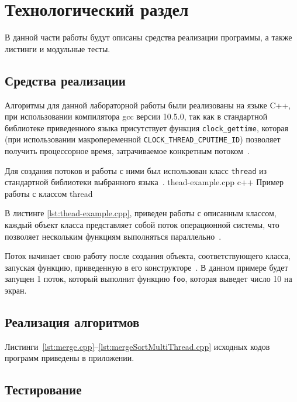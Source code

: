 \chapter{Технологический раздел}

В данной части работы будут описаны средства реализации программы, а также листинги и  модульные  тесты.

\section{Средства реализации}
Алгоритмы для данной лабораторной работы были реализованы на языке C++, при использовании компилятора gcc версии 10.5.0, так как в стандартной библиотеке приведенного языка
присутствует функция \texttt{clock\_gettime}, которая (при использовании макропеременной \texttt{CLOCK\_THREAD\_CPUTIME\_ID}) позволяет получить процессорное время, затрачиваемое конкретным потоком~\cite{cpp-time}.

Для создания потоков и работы с ними был использован класс \texttt{thread} из стандартной библиотеки выбранного языка~\cite{std-thread}.
{thead-example.cpp} %
{c++} %
{Пример работы с классом thread} %

В листинге \ref{lst:thead-example.cpp}, приведен работы с описанным классом, каждый объект класса представляет собой поток операционной системы, что позволяет нескольким функциям выполняться параллельно~\cite{std-thread}. 

Поток начинает свою работу после создания объекта, соответствующего класса, запуская функцию, приведенную в его конструкторе~\cite{std-thread}.
В данном примере будет запущен 1 поток, который выполнит функцию \texttt{foo},
которая выведет число 10 на экран.


\section{Реализация алгоритмов}
Листинги~\ref{lst:merge.cpp}--\ref{lst:mergeSortMultiThread.cpp} исходных кодов программ приведены в приложении. 

\section{Тестирование}

